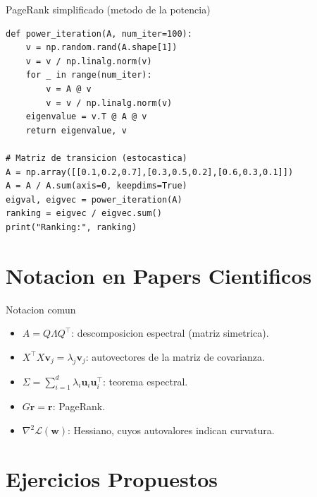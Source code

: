 \documentclass[aspectratio=169, 10pt, xcolor=table]{beamer}
\begin{document}
\begin{frame}[fragile]{PageRank simplificado (metodo de la potencia)}
    \begin{lstlisting}
def power_iteration(A, num_iter=100):
    v = np.random.rand(A.shape[1])
    v = v / np.linalg.norm(v)
    for _ in range(num_iter):
        v = A @ v
        v = v / np.linalg.norm(v)
    eigenvalue = v.T @ A @ v
    return eigenvalue, v

# Matriz de transicion (estocastica)
A = np.array([[0.1,0.2,0.7],[0.3,0.5,0.2],[0.6,0.3,0.1]])
A = A / A.sum(axis=0, keepdims=True)
eigval, eigvec = power_iteration(A)
ranking = eigvec / eigvec.sum()
print("Ranking:", ranking)
    \end{lstlisting}
\end{frame}

\section{Notacion en Papers Cientificos}

\begin{frame}{Notacion comun}
    \begin{itemize}
        \item $A = Q\Lambda Q^\top$: descomposicion espectral (matriz simetrica).
        \item $X^\top X \mathbf{v}_j = \lambda_j \mathbf{v}_j$: autovectores de la matriz de covarianza.
        \item $\Sigma = \sum_{i=1}^d \lambda_i \mathbf{u}_i\mathbf{u}_i^\top$: teorema espectral.
        \item $G\mathbf{r} = \mathbf{r}$: PageRank.
        \item $\nabla^2\mathcal{L}(\mathbf{w})$: Hessiano, cuyos autovalores indican curvatura.
    \end{itemize}
\end{frame}

\section{Ejercicios Propuestos}
\end{document}
